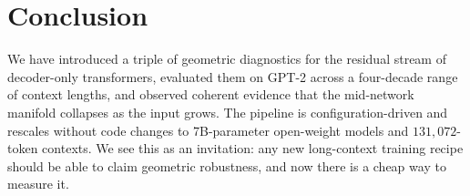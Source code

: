 \section{Conclusion}\label{sec:conclusion}

We have introduced a triple of geometric diagnostics for the residual
stream of decoder-only transformers, evaluated them on GPT-2 across a
four-decade range of context lengths, and observed coherent evidence that
the mid-network manifold collapses as the input grows. The pipeline is
configuration-driven and rescales without code changes to 7B-parameter
open-weight models and $131{,}072$-token contexts. We see this as an
invitation: any new long-context training recipe should be able to claim
geometric robustness, and now there is a cheap way to measure it.
